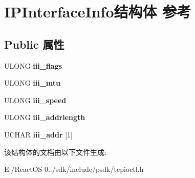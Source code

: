 \hypertarget{struct_i_p_interface_info}{}\section{I\+P\+Interface\+Info结构体 参考}
\label{struct_i_p_interface_info}
\subsection*{Public 属性}
\begin{DoxyCompactItemize}
\item 
\mbox{\label{struct_i_p_interface_info_ac9637617757cdfb59937a365e5ae503b}} 
U\+L\+O\+NG {\bfseries iii\+\_\+flags}
\item 
\mbox{\label{struct_i_p_interface_info_ac84d92df70b16ae749e8292fa9737387}} 
U\+L\+O\+NG {\bfseries iii\+\_\+mtu}
\item 
\mbox{\label{struct_i_p_interface_info_a7c0fe6a81ad67766ecdc931d9578ee76}} 
U\+L\+O\+NG {\bfseries iii\+\_\+speed}
\item 
\mbox{\label{struct_i_p_interface_info_a0783a0a0f126ca3a9cd8abc46bd754af}} 
U\+L\+O\+NG {\bfseries iii\+\_\+addrlength}
\item 
\mbox{\label{struct_i_p_interface_info_a6068a9a64d0af71010a0b5c6e9254dc2}} 
U\+C\+H\+AR {\bfseries iii\+\_\+addr} \mbox{[}1\mbox{]}
\end{DoxyCompactItemize}


该结构体的文档由以下文件生成\+:\begin{DoxyCompactItemize}
\item 
E\+:/\+React\+O\+S-\/0../sdk/include/psdk/tcpioctl.\+h\end{DoxyCompactItemize}
